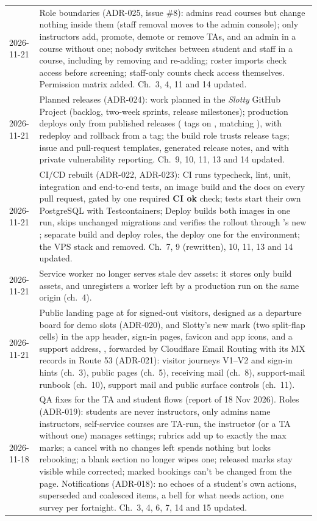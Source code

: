 \begin{xltabular}{\linewidth}{@{}l L@{}}
  2026-11-21 & Role boundaries (ADR-025, issue \#8): admins read courses but change nothing inside them (staff removal moves to the admin console); only instructors add, promote, demote or remove TAs, and an admin in a course without one; nobody switches between student and staff in a course, including by removing and re-adding; roster imports check access before screening; staff-only counts check access themselves. Permission matrix added. Ch.~3, 4, 11 and 14 updated.\\
  2026-11-21 & Planned releases (ADR-024): work planned in the \emph{Slotty} GitHub Project (backlog, two-week sprints, release milestones); production deploys only from published releases ( tags on , matching ), with redeploy and rollback from a tag; the build role trusts release tags; issue and pull-request templates, generated release notes, and  with private vulnerability reporting. Ch.~9, 10, 11, 13 and 14 updated.\\
  2026-11-21 & CI/CD rebuilt (ADR-022, ADR-023): CI runs typecheck, lint, unit, integration and end-to-end tests, an image build and the docs on every pull request, gated by one required \textbf{CI ok} check; tests start their own PostgreSQL with Testcontainers; Deploy builds both images in one run, skips unchanged migrations and verifies the rollout through 's new ; separate build and deploy roles, the deploy one for the  environment; the VPS stack and  removed. Ch.~7, 9 (rewritten), 10, 11, 13 and 14 updated.\\
  2026-11-21 & Service worker no longer serves stale dev assets: it stores only  build assets, and  unregisters a worker left by a production run on the same origin (ch.~4).\\
  2026-11-21 & Public landing page at \route{/} for signed-out visitors, designed as a departure board for demo slots (ADR-020), and Slotty's new mark (two split-flap cells) in the app header, sign-in pages, favicon and app icons, and a support address, , forwarded by Cloudflare Email Routing with its MX records in Route 53 (ADR-021): visitor journeys V1--V2 and sign-in hints (ch.~3), public pages (ch.~5), receiving mail (ch.~8), support-mail runbook (ch.~10), support mail and public surface controls (ch.~11).\\
  2026-11-18 & QA fixes for the TA and student flows (report of 18 Nov 2026). Roles (ADR-019): students are never instructors, only admins name instructors, self-service courses are TA-run, the instructor (or a TA without one) manages settings; rubrics add up to exactly the max marks; a cancel with no changes left spends nothing but locks rebooking; a blank section no longer wipes one; released marks stay visible while corrected; marked bookings can't be changed from the page. Notifications (ADR-018): no echoes of a student's own actions, superseded and coalesced items, a bell for what needs action, one survey per fortnight. Ch.~3, 4, 6, 7, 14 and 15 updated.\\

\end{xltabular}
